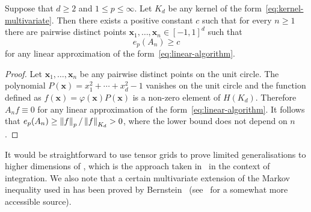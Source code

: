 \documentclass{mcom-l}
\numberwithin{equation}{section}
\numberwithin{theorem}{section} %
\renewcommand{\b}[1]{\bm{#1}}
\begin{document}
\begin{proposition}
  Suppose that $d \geq 2$ and $1 \leq p \leq \infty$.
  Let $K_d$ be any kernel of the form~\eqref{eq:kernel-multivariate}.
  Then there exists a positive constant $c$ such that for every $n \geq 1$ there are pairwise distinct points $\b{x}_1, \ldots, \b{x}_n \in [-1, 1]^d$ such that
  \begin{equation*}
    e_p(A_n) \geq c
  \end{equation*}
  for any linear approximation of the form~\eqref{eq:linear-algorithm}.
\end{proposition}
\begin{proof}
  Let $\b{x}_1, \ldots, \b{x}_n$ be any pairwise distinct points on the unit circle.
  The polynomial $P(\b{x}) = x_1^2 + \cdots + x_d^2 - 1$ vanishes on the unit circle and the function defined as $f(\b{x}) = \varphi(\b{x}) P(\b{x})$ is a non-zero element of $H(K_d)$.
  Therefore $A_n f \equiv 0$ for any linear approximation of the form~\eqref{eq:linear-algorithm}.
  It follows that $e_p(A_n) \geq \norm[0]{f}_p / \norm[0]{f}_{K_d} > 0$, where the lower bound does not depend on $n$.
\end{proof}

It would be straightforward to use tensor grids to prove limited generalisations to higher dimensions of , which is the approach taken in~\cite{KuoSloanWozniakowski2017} in the context of integration.
We also note that a certain multivariate extension of the Markov inequality used in  has been proved by Bernstein~\cite{Bernstein1948} (see~\cite{Ganzburg2021} for a somewhat more accessible source).


\end{document}
